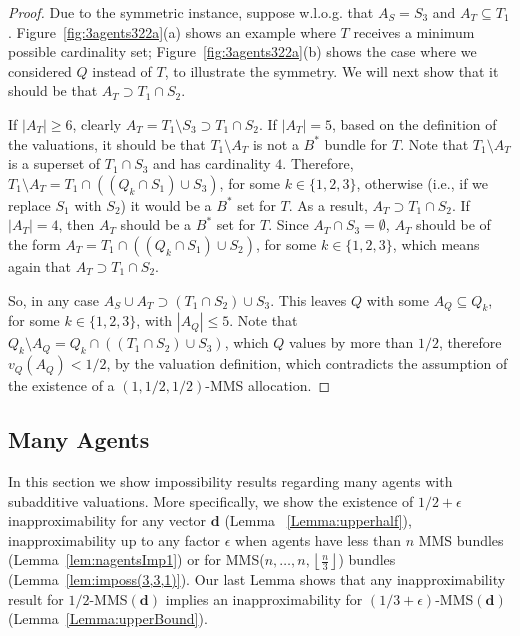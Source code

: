\begin{proof}
Due to the symmetric instance, suppose w.l.o.g. that $A_S=S_3$ and $A_T\subseteq T_1$. Figure~\ref{fig:3agents322a}(a) shows an example where $T$ receives a minimum possible cardinality set;  Figure~\ref{fig:3agents322a}(b) shows the case where we considered $Q$ instead of $T$, to illustrate the symmetry. We will next show that it should be that $A_T\supset T_1\cap S_2$. 

If $|A_T|\geq 6$, clearly $A_T=T_1\setminus S_3 \supset T_1\cap S_2$.
If $|A_T| = 5$, based on the definition of the valuations, it should be that $T_1\setminus A_T$ is not a $B^*$ bundle for $T$. Note that $T_1\setminus A_T $ is a superset of $ T_1\cap S_3$ and has cardinality $4$. Therefore, $T_1\setminus A_T = T_1\cap ((Q_k\cap S_1)\cup S_3)$, for some $k\in \{1,2,3\}$, otherwise (i.e., if we replace $S_1$ with $S_2$) it would be a $B^*$ set for $T$. As a result, $A_T \supset T_1\cap S_2$. If $|A_T| = 4$, then $A_T$ should be a $B^*$ set for $T$. Since $A_T\cap S_3 =\emptyset$, $A_T$ should be of the form $A_T = T_1\cap ((Q_k\cap S_1)\cup S_2)$, for some $k\in \{1,2,3\}$, which means again that  $A_T \supset T_1\cap S_2$. 

So, in any case $A_S\cup A_T \supset (T_1\cap S_2)\cup S_3$. This leaves $Q$ with some $A_Q\subseteq Q_k$, for some $k\in\{1,2,3\}$, with $|A_Q|\leq 5$. Note that $Q_k\setminus A_Q = Q_k\cap ((T_1\cap S_2)\cup S_3)$, which $Q$ values by more than $1/2$, therefore $v_Q(A_Q)<1/2$, by the valuation definition, which contradicts the assumption of the existence of a $(1,1/2,1/2)$-MMS allocation.
\end{proof}


\subsection{Many Agents}
\label{sec:ManyAgentsImpossib}
In this section we show impossibility results regarding many agents with subadditive valuations. More specifically, we show the existence of $1/2+\epsilon$ inapproximability for any vector $\boldsymbol{d}$ (Lemma ~\ref{Lemma:upperhalf}), inapproximability up to any factor $\epsilon$ when agents have less than $n$ MMS bundles (Lemma~\ref{lem:nagentsImp1}) or for MMS($n,\ldots,n,\left\lfloor\frac{n}{3}\right\rfloor$) bundles (Lemma~\ref{lem:imposs(3,3,1)}). Our last Lemma shows that any inapproximability result for $1/2$-MMS$(\mathbf{d})$ implies an inapproximability for $(1/3+\epsilon)$-MMS$(\mathbf{d})$ (Lemma~\ref{Lemma:upperBound}).


